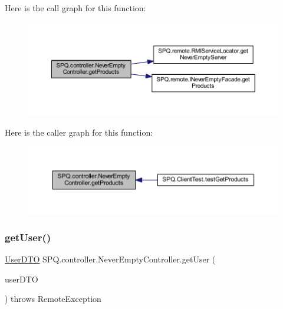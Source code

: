 Here is the call graph for this function\+:
\nopagebreak
\begin{figure}[H]
\begin{center}
\leavevmode
\includegraphics[width=350pt]{class_s_p_q_1_1controller_1_1_never_empty_controller_ace99d4d39979b72d620871475a4817f9_cgraph}
\end{center}
\end{figure}
Here is the caller graph for this function\+:
\nopagebreak
\begin{figure}[H]
\begin{center}
\leavevmode
\includegraphics[width=350pt]{class_s_p_q_1_1controller_1_1_never_empty_controller_ace99d4d39979b72d620871475a4817f9_icgraph}
\end{center}
\end{figure}
\mbox{\label{class_s_p_q_1_1controller_1_1_never_empty_controller_a4f799c7fc9ce32740ec45401fa6fd1b1}} 
\subsubsection{\texorpdfstring{get\+User()}{getUser()}}
{\footnotesize\ttfamily \mbox{\hyperlink{class_s_p_q_1_1dto_1_1_user_d_t_o}{User\+D\+TO}} S\+P\+Q.\+controller.\+Never\+Empty\+Controller.\+get\+User (\begin{DoxyParamCaption}\item[{\mbox{\hyperlink{class_s_p_q_1_1dto_1_1_user_d_t_o}{User\+D\+TO}}}]{user\+D\+TO }\end{DoxyParamCaption}) throws Remote\+Exception}

